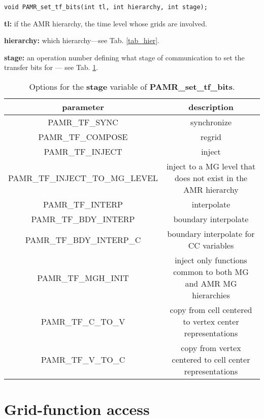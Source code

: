 \documentclass[aps,amssymb,unsortedaddress,nofootinbib]{revtex4}
\def\lsep{\itemsep 0.05in}
\begin{document}

\begin{verbatim}
void PAMR_set_tf_bits(int tl, int hierarchy, int stage);
\end{verbatim}
\begin{list}{}{\lsep}
\item {\bf tl:} if the AMR hierarchy, the time level whose grids are involved.
\item {\bf hierarchy:} which hierarchy---see Tab. \ref{tab_hier}.
\item {\bf stage:} an operation number defining what stage of communication
                   to set the transfer bits for --- see Tab. \ref{tab_stage_ops}.
\end{list}

\begin{table}
\begin{center}
\begin{tabular}[t]{| c || c |}
\hline
parameter & description \\
\hline
\hline
PAMR\_TF\_SYNC& synchronize \\
PAMR\_TF\_COMPOSE& regrid \\
PAMR\_TF\_INJECT& inject \\
PAMR\_TF\_INJECT\_TO\_MG\_LEVEL& inject to a MG level that does not exist in the AMR hierarchy\\
PAMR\_TF\_INTERP& interpolate \\
PAMR\_TF\_BDY\_INTERP& boundary interpolate\\
PAMR\_TF\_BDY\_INTERP\_C& boundary interpolate for CC variables\\
PAMR\_TF\_MGH\_INIT& inject only functions common to both MG and AMR MG hierarchies\\
PAMR\_TF\_C\_TO\_V& copy from cell centered to vertex center representations\\
PAMR\_TF\_V\_TO\_C& copy from vertex centered to cell center representations\\
\hline
\end{tabular}
\end{center}
\caption
{ Options for the {\bf stage} variable of {\bf PAMR\_set\_tf\_bits}.
\label{tab_stage_ops}}
\end{table}


\section{Grid-function access}
\end{document}

